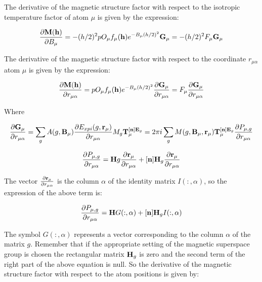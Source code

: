 \documentclass[10pt]{article}
\begin{document}
The derivative of the magnetic structure factor with respect to the isotropic temperature factor of atom $\mu$ is given by the expression:


\begin{equation} \label{der_biso}
\frac{\partial{\bf M}({\bf h})}{\partial B_\mu}= -(h/2)^2 p O_\mu f_{\mu}({\bf h}) e^{-B_\mu (h/2)^2 } {\bf G}_\mu = -(h/2)^2 F_\mu {\bf G}_\mu
\end{equation}

The derivative of the magnetic structure factor with respect to the coordinate $r_{\mu\alpha}$ atom $\mu$ is given by the expression:

\begin{equation} \label{der_ralpha}
\frac{\partial{\bf M}({\bf h})}{\partial r_{\mu\alpha}}=  p O_\mu f_{\mu}({\bf h}) e^{-B_\mu (h/2)^2 } \frac{\partial{\bf G}_\mu}{\partial  r_{\mu\alpha} }=  F_\mu \frac{\partial{\bf G}_\mu}{\partial  r_{\mu\alpha} }
\end{equation}

Where

\begin{equation} \label{der_ralpha2}
\frac{\partial{\bf G}_\mu}{\partial  r_{\mu\alpha} } = \sum_g A(g,{\bf B}_\mu) \frac{\partial E_{xpi}(g,{\bf r}_\mu)}{\partial  r_{\mu\alpha}} M_g {\bf T}_{\mu}^{[{\bf n}]{\bf E}_g} =  2 \pi i \sum_g M(g,{\bf B}_\mu,{\bf r}_\mu)  {\bf T}_{\mu}^{[{\bf n}]{\bf E}_g} \frac{\partial P_{\mu,g} }{\partial r_{\mu\alpha}}
\end{equation}

\begin{equation}
\frac{\partial P_{\mu,g} }{\partial r_{\mu\alpha}}=  {\bf H}g \frac{\partial {\bf r}_\mu}{\partial r_{\mu\alpha}} + [{\bf n}] {\bf H}_g \frac{\partial {\bf r}_\mu}{\partial r_{\mu\alpha}} 
\end{equation}

The vector $\frac{\partial {\bf r}_\mu}{\partial r_{\mu\alpha}}$ is the column $\alpha$ of the identity matrix $I(:,\alpha)$, so the expression of the above term is:

\begin{equation}
\frac{\partial P_{\mu,g} }{\partial r_{\mu\alpha}}=  {\bf H}G(:,\alpha)  + [{\bf n}] {\bf H}_g I(:,\alpha)
\end{equation}

The symbol $G(:,\alpha)$ represents a vector corresponding to the column $\alpha$ of the matrix $g$.
Remember that if the appropriate setting of the magnetic superspace group is chosen the rectangular matrix ${\bf H}_g$ is zero and the second term of the right part of the above equation is null. So the derivative of the magnetic structure factor with respect to the atom positions is given by:
\end{document}
